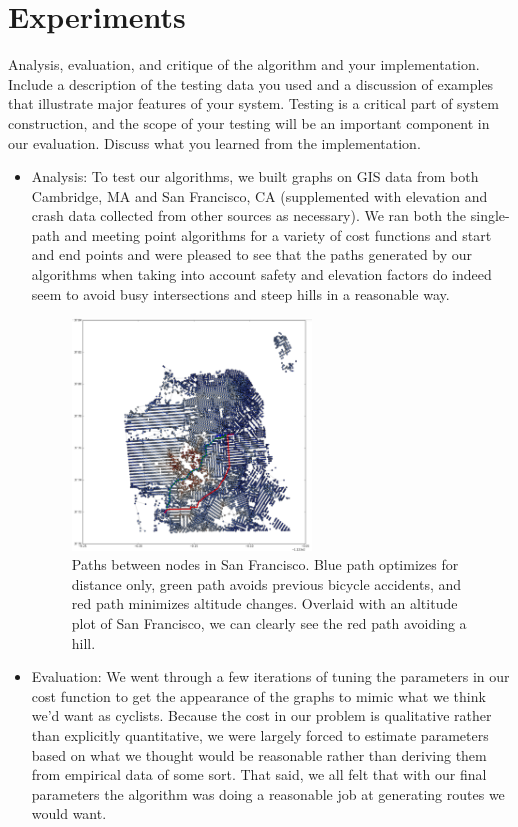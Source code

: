 \documentclass[11pt]{article}
\begin{document}
\section{Experiments}
Analysis, evaluation, and critique of the algorithm and your
implementation. Include a description of the testing data you used and
a discussion of examples that illustrate major features of your
system. Testing is a critical part of system construction, and the
scope of your testing will be an important component in our
evaluation. Discuss what you learned from the implementation.
\begin{itemize}

\item{Analysis:} To test our algorithms, we built graphs on GIS data from both Cambridge, MA and San Francisco, CA (supplemented with elevation and crash data collected from other sources as necessary). We ran both the single-path and meeting point algorithms for a variety of cost functions and start and end points and were pleased to see that the paths generated by our algorithms when taking into account safety and elevation factors do indeed seem to avoid busy intersections and steep hills in a reasonable way.

\begin{figure}[H]
\caption{Paths between nodes in San Francisco. Blue path optimizes for distance only, green path avoids previous bicycle accidents, and red path minimizes altitude changes. Overlaid with an altitude plot of San Francisco, we can clearly see the red path avoiding a hill.}
\includegraphics[width=0.6\textwidth]{sf_new_plot_2.png}
\end{figure}

\item{Evaluation:} We went through a few iterations of tuning the parameters in our cost function to get the appearance of the graphs to mimic what we think we'd want as cyclists. Because the cost in our problem is qualitative rather than explicitly quantitative, we were largely forced to estimate parameters based on what we thought would be reasonable rather than deriving them from empirical data of some sort. That said, we all felt that with our final parameters the algorithm was doing a reasonable job at generating routes we would want.


\end{itemize}
\end{document}
